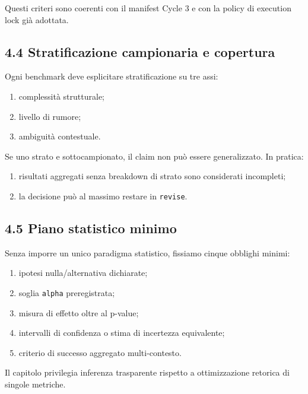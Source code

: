 Questi criteri sono coerenti con il manifest Cycle 3 e con la policy di execution lock già adottata.

\subsection{4.4 Stratificazione campionaria e copertura}

Ogni benchmark deve esplicitare stratificazione su tre assi:

\begin{enumerate}
\def\labelenumi{\arabic{enumi}.}
\tightlist
\item
  complessità strutturale;
\item
  livello di rumore;
\item
  ambiguità contestuale.
\end{enumerate}

Se uno strato e sottocampionato, il claim non può essere generalizzato. In pratica:

\begin{enumerate}
\def\labelenumi{\arabic{enumi}.}
\tightlist
\item
  risultati aggregati senza breakdown di strato sono considerati incompleti;
\item
  la decisione può al massimo restare in \texttt{revise}.
\end{enumerate}

\subsection{4.5 Piano statistico minimo}

Senza imporre un unico paradigma statistico, fissiamo cinque obblighi minimi:

\begin{enumerate}
\def\labelenumi{\arabic{enumi}.}
\tightlist
\item
  ipotesi nulla/alternativa dichiarate;
\item
  soglia \texttt{alpha} preregistrata;
\item
  misura di effetto oltre al p-value;
\item
  intervalli di confidenza o stima di incertezza equivalente;
\item
  criterio di successo aggregato multi-contesto.
\end{enumerate}

Il capitolo privilegia inferenza trasparente rispetto a ottimizzazione retorica di singole metriche.

